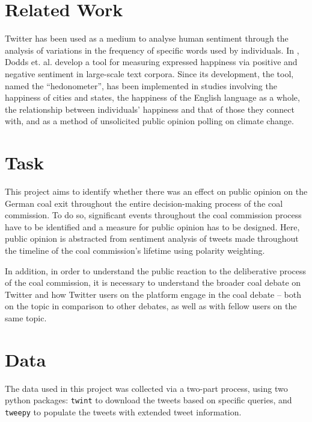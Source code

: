 \documentclass[10pt,twocolumn,twoside,lineno]{pnas-new}
\begin{document}
\section*{Related Work} \label{sec:relatedwork}

Twitter has been used as a medium to analyse human sentiment through the analysis of variations in the frequency of specific words used by individuals. In \cite{Dodds2011}, Dodds et. al. develop a tool for measuring expressed happiness via positive and negative sentiment in large-scale text corpora. Since its development, the tool, named the ``hedonometer'', has been implemented in studies involving the happiness of cities and states, the happiness of the English language as a whole, the relationship between individuals' happiness and that of those they connect with, and as a method of unsolicited public opinion polling on climate change. \cite{Cody2015} %

\section*{Task} \label{sec:task}
This project aims to identify whether there was an effect on public opinion on the German coal exit throughout the entire decision-making process of the coal commission. To do so, significant events throughout the coal commission process have to be identified and a measure for public opinion has to be designed. Here, public opinion is abstracted from sentiment analysis of tweets made throughout the timeline of the coal commission's lifetime using polarity weighting. 

In addition, in order to understand the public reaction to the deliberative process of the coal commission, it is necessary to understand the broader coal debate on Twitter and how Twitter users on the platform engage in the coal debate -- both on the topic in comparison to other debates, as well as with fellow users on the same topic. 

\section*{Data} \label{sec:data}
The data used in this project was collected via a two-part process, using two python packages: \texttt{twint} to download the tweets based on specific queries, and \texttt{tweepy} to populate the tweets with extended tweet information. %

\end{document}
